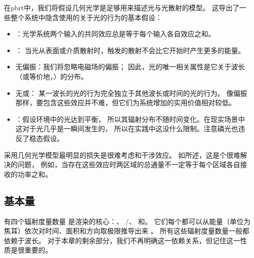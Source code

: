 在pbrt中，我们将假设几何光学是足够用来描述光与光散射的模型。
这导出了一些整个系统中隐含使用的关于光的行为的基本假设：
\begin{itemize}
    \item {}：光学系统两个输入的共同效应总是等于每个输入各自效应之和。
    \item {}：
          当光从表面或介质散射时，触发的散射不会比它开始时产生更多的能量。
    \item {\sffamily 无偏振}：我们将忽略电磁场的偏振；
          因此，光的唯一相关属性是它关于波长（或等价地，）的分布。
    \item {\sffamily 无}或：
          某一波长的光的行为完全独立于其他波长或时间的光的行为。
          像偏振那样，要包含这些效应并不难，但它们为系统增加的实用价值相对较低。
    \item {}：假设环境中的光达到平衡，
          所以其辐射分布不随时间变化。在现实场景中这对于光几乎是一瞬间发生的，
          所以在实践中这没什么限制。注意磷光也违反了稳态假设。
\end{itemize}

采用几何光学模型最明显的损失是很难考虑和干涉效应。
如\citet[p. 24]{PREISENDORFER19653}所述，这是个很难解决的问题，
例如，当存在这些效应时两区域的总通量不一定等于每个区域各自接收的功率之和。

\subsection{基本量}\label{sub:基本量}
有四个辐射度量数量
是渲染的核心：、
/、
和。
它们每个都可以从能量（单位为焦耳）依次对时间、面积和方向取极限推导出来
。
所有这些辐射度量数量一般都依赖于波长。
对于本章的剩余部分，我们不再明确这一依赖关系，但记住这一性质是很重要的。

